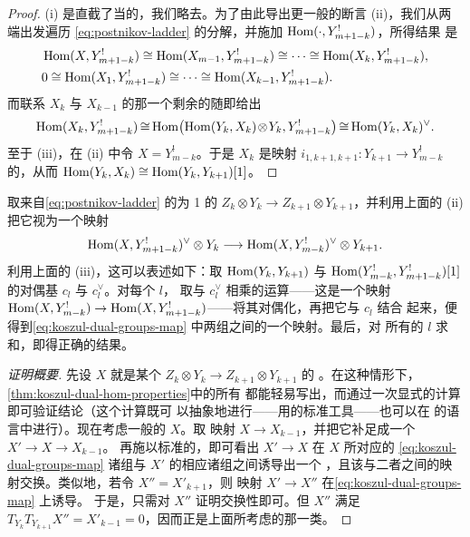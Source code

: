 \begin{proof}
(i) 是直截了当的，我们略去。为了由此导出更一般的断言 (ii)，我们从两端出发遍历
\eqref{eq:postnikov-ladder} 的分解，并施加 $\operatorname{Hom}(\cdot,Y^!_{m+1-k})$，所得结果
是
\begin{equation*}
\begin{aligned}
&\operatorname{Hom}(X,Y^!_{m+1-k})\cong\operatorname{Hom}(X_{m-1},Y^!_{m+1-k})
\cong\cdots\cong\operatorname{Hom}(X_k,Y^!_{m+1-k}),\\
&0\cong\operatorname{Hom}(X_1,Y^!_{m+1-k})\cong\cdots\cong\operatorname{Hom}(X_{k-1},Y^!_{m+1-k}).
\end{aligned}
\end{equation*}
而联系 $X_k$ 与 $X_{k-1}$ 的那一个剩余的\trExactTriangle{}随即给出
\begin{equation*}
\medmuskip=1.5mu\relax\thickmuskip=3mu\relax
\Hom(X_k,Y^!_{m+1-k})\cong\Hom\bigl(\Hom(Y_k,X_k)\otimes
Y_k,Y^!_{m+1-k}\bigr)\cong\Hom(Y_k,X_k)^{\vee}.
\end{equation*}
至于 (iii)，在 (ii) 中令 $X=Y^!_{m-k}$。于是 $X_k$ 是映射
$i_{1,k+1,k+1}\colon Y_{k+1}\to Y^!_{m-k}$ 的\trCone，从而
$\operatorname{Hom}(Y_k,X_k)\cong\operatorname{Hom}(Y_k,Y_{k+1})[1]$。
\end{proof}

\begin{lemma}\label{thm:koszul-dual-map}
取来自\eqref{eq:postnikov-ladder} 的\trDegree{}为 1 的\trMorphism{}%
$Z_k\otimes Y_k\to Z_{k+1}\otimes Y_{k+1}$，并利用上面的\trIsomorphism{} (ii)
把它视为一个映射
\begin{equation}\label{eq:koszul-dual-groups-map}
\operatorname{Hom}(X,Y^!_{m+1-k})^{\vee}\otimes Y_k
\longrightarrow\operatorname{Hom}(X,Y^!_{m-k})^{\vee}\otimes Y_{k+1}.
\end{equation}
利用上面的 (iii)，这可以表述如下：取 $\operatorname{Hom}(Y_k,Y_{k+1})$ 与
$\operatorname{Hom}(Y^!_{m-k},Y^!_{m+1-k})[1]$ 的对偶基 $c_l$ 与 $c^{\vee}_l$。对每个 $l$，
取与 $c^{\vee}_l$ 相乘的运算——这是一个\trLinear{}映射
$\operatorname{Hom}(X,Y^!_{m-k})\to\operatorname{Hom}(X,Y^!_{m+1-k})$——将其对偶化，再把它与 $c_l$ 结合
起来，便得到\eqref{eq:koszul-dual-groups-map} 中两组之间的一个映射。最后，对
所有的 $l$ 求和，即得正确的结果。
\end{lemma}

\begin{proof}[证明概要]
先设 $X$ 就是某个\trMorphism{} $Z_k\otimes Y_k\to Z_{k+1}\otimes Y_{k+1}$ 的%
\trCone。在这种情形下，\cref{thm:koszul-dual-hom-properties}中的所有%
\trIsomorphism{}都能轻易写出，而通过一次显式的计算即可验证结论（这个计算既可
以抽象地进行——用\trTriangulated{}\trCategory{}的标准工具——也可以在%
\trTwistedComplex{}的语言中进行）。现在考虑一般的\trObject{} $X$。取\trCanonical{}%
映射 $X\to X_{k-1}$，并把它补足成一个\trExactTriangle{} $X'\to X\to X_{k-1}$。
再施以标准的\trExactTriangle，即可看出 $X'\to X$ 在 $X$ 所对应的%
\eqref{eq:koszul-dual-groups-map} 诸组与 $X'$ 的相应诸组之间诱导出一个%
\trIsomorphism，且该\trIsomorphism{}与二者之间的映射交换。类似地，若令
$X''=X'_{k+1}$，则
映射 $X'\to X''$ 在\eqref{eq:koszul-dual-groups-map} 上诱导\trIsomorphism。
于是，只需对 $X''$ 证明交换性即可。但 $X''$ 满足
$T_{Y_k}T_{Y_{k+1}}X''=X'_{k-1}=0$，因而正是上面所考虑的那一类\trCone。
\end{proof}
